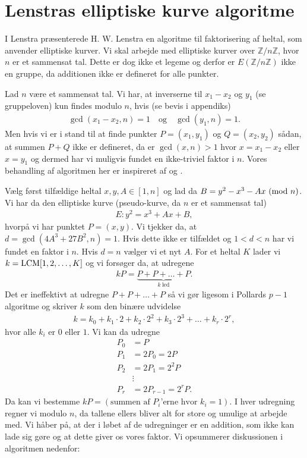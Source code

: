 \section{Lenstras elliptiske kurve algoritme}

I \cite{Lenstra}
Lenstra præsenterede H. W. Lenstra en algoritme til faktorisering af heltal, som anvender elliptiske kurver. Vi skal arbejde med elliptiske kurver over $\mathbb{Z}/n \mathbb{Z}$, hvor $n$ er et sammensat tal. Dette er dog ikke et legeme og derfor er $E(\mathbb{Z}/n\mathbb{Z})$ ikke en gruppe, da additionen ikke er defineret for alle punkter.

Lad $n$ være et sammensat tal. Vi har, at inverserne til $x_1 - x_2$ og $y_1$ (se gruppeloven) kun findes modulo $n$, hvis (se bevis i appendiks)
\begin{align*}
	\gcd(x_1 - x_2, n) = 1 \quad \text{og} \quad \gcd(y_1, n) = 1.
\end{align*}
Men hvis vi er i stand til at finde punkter $P=(x_1, y_1)$ og $Q=(x_2, y_2)$ sådan, at summen $P+Q$ ikke er defineret, da er $\gcd(x, n) > 1$ hvor $x=x_1-x_2$ eller $x=y_1$ og dermed har vi muligvis fundet en ikke-triviel faktor i $n$. Vores behandling af algoritmen her er inspireret af \cite{Silverman} og \cite{Washington}.

Vælg først tilfældige heltal $x, y, A \in [1, n]$ og lad da $B=y^{2} - x^{3} - Ax \ (\mathrm{mod} \ n)$. Vi har da den elliptiske kurve (pseudo-kurve, da $n$ er et sammensat tal)
\begin{align*}
	E : y^2 = x^3 + Ax + B,
\end{align*} 
hvorpå vi har punktet $P=(x, y)$. Vi tjekker da, at $d= \gcd(4A^3 + 27B^2, n) = 1$. Hvis dette ikke er tilfældet og $1 < d < n$ har vi fundet en faktor i $n$. Hvis $d = n$ vælger vi et nyt $A$. For et heltal $K$ lader vi $k=\mathrm{LCM}[1, 2, \ldots, K]$ og vi forsøger da, at udregene 
\begin{align*}
	kP = \underbrace{P + P + \ldots + P}_{k \ \text{led}}.
\end{align*}
Det er ineffektivt at udregne $P+P + \ldots + P$ så vi gør ligesom i Pollards $p-1$ algoritme og skriver $k$ som den binære udvidelse
\begin{align*}
	k = k_0 + k_1 \cdot 2 + k_2 \cdot 2^2 + k_ 3 \cdot 2^3 + \ldots + k_r \cdot 2^r,
\end{align*}
hvor alle $k_i$ er $0$ eller $1$. Vi kan da udregne
\begin{align*}
	P_0 &= P \\
	P_1 &= 2P_0 = 2P \\
	P_2 &= 2P_1 = 2^2 P \\
	&\vdots \\
	P_r &= 2 P_{r-1} = 2^r P.
\end{align*}
Da kan vi bestemme $kP= (\text{summen af $P_i$'erne hvor $k_i = 1$})$. I hver udregning regner vi modulo $n$, da tallene ellers bliver alt for store og umulige at arbejde med. Vi håber på, at der i løbet af de udregninger er en addition, som ikke kan lade sig gøre og at dette giver os vores faktor. Vi opsummerer diskussionen i algoritmen nedenfor:

